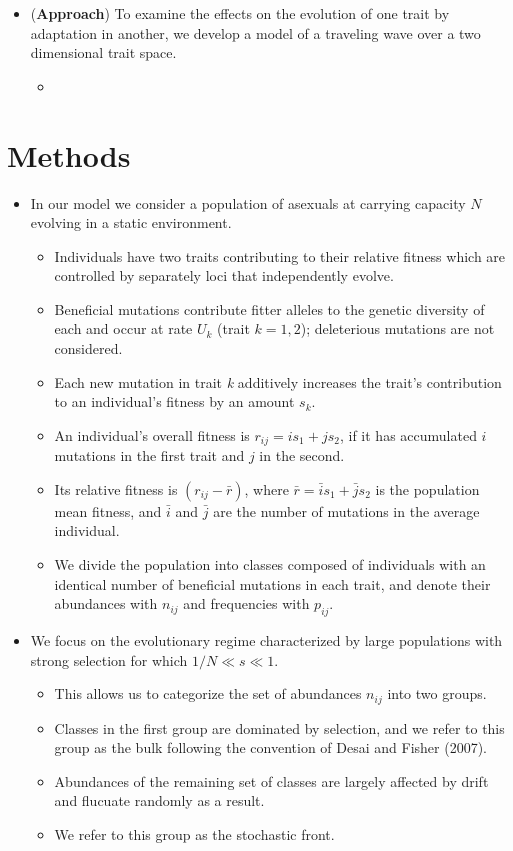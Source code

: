 \documentclass[11pt,one column]{article}
\begin{document}
\begin{itemize}
\item (\textbf{Approach}) To examine the effects on the evolution of one trait by adaptation in another, we develop a model of a traveling wave over a two dimensional trait space.
\begin{itemize}
\item 
\end{itemize}

\end{itemize}

\section*{Methods}
\begin{itemize}
\item In our model we consider a population of asexuals at carrying capacity $N$ evolving in a static environment.
\begin{itemize}
\item Individuals have two traits contributing to their relative fitness which are controlled by separately loci that independently evolve.
\item Beneficial mutations contribute fitter alleles to the genetic diversity of each and occur at rate $U_k$ (trait $k=1,2$); deleterious mutations are not considered.
\item Each new mutation in trait \textit{k} additively increases the trait's contribution to an individual's fitness by an amount $s_k$.
\item An individual's overall fitness is $r_{ij} = i s_1+j s_2$, if it has accumulated $i$ mutations in the first trait and $j$ in the second.
\item Its relative fitness is $(r_{ij}-\bar{r})$, where $\bar{r} = \bar{i} s_1+\bar{j} s_2$ is the population mean fitness, and $\bar{i}$ and $\bar{j}$ are the number of mutations in the average individual.
\item We divide the population into classes composed of individuals with an identical number of beneficial mutations in each trait, and denote their abundances with $n_{ij}$ and frequencies with $p_{ij}$.
\end{itemize}	

\item We focus on the evolutionary regime characterized by large populations with strong selection for which $1/N \ll s \ll 1$.
\begin{itemize}
\item This allows us to categorize the set of abundances $n_{ij}$ into two groups.
\item Classes in the first group are dominated by selection, and we refer to this group as the bulk following the convention of Desai and Fisher (2007).
\item Abundances of the remaining set of classes are largely affected by drift and flucuate randomly as a result.
\item We refer to this group as the stochastic front.
\end{itemize}


\end{itemize}
\end{document}
